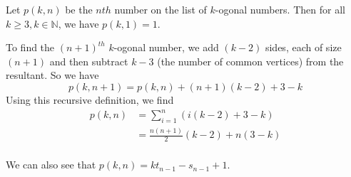 
    \begin{solution}
        Let $p(k,n)$ be the $nth$ number on the list of
        $k$-ogonal numbers. Then for all $k\ge3,
        k\in\mathbb{N}$, we have $p(k,1)=1$.

        To find the $(n+1)^{th}$ $k$-ogonal number, we 
        add $(k-2)$ sides, each of size $(n+1)$ and then 
        subtract $k-3$ (the number of common vertices)
        from the resultant. So we have
        $$p(k,n+1)=p(k,n)+(n+1)(k-2)+3-k$$
        Using this recursive definition, we find
        \begin{align*}
            p(k,n)&=\sum_{i=1}^n{
                    (i(k-2)+3-k)
            }\\
            &= \frac{n(n+1)}{2}(k-2)+n(3-k)\\
        \end{align*}
        \begin{note}
            We can 
            also see that $p(k,n) = kt_{n-1}-s_{n-1}+1$.
        \end{note}
    \end{solution}